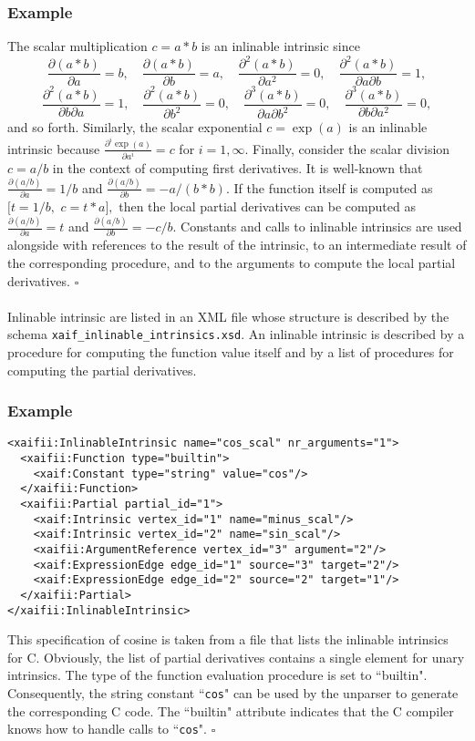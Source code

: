 \documentclass{book}
\begin{document}
\subsubsection{Example}
The scalar multiplication $c=a*b$ 
is an inlinable 
intrinsic since
$$
\frac{\partial (a*b)}{\partial a} = b, \quad
\frac{\partial (a*b)}{\partial b} = a, \quad
\frac{\partial^2 (a*b)}{\partial a^2} = 0, \quad
\frac{\partial^2 (a*b)}{\partial a \partial b} = 1, 
$$
$$
\frac{\partial^2 (a*b)}{\partial b \partial a} = 1, \quad
\frac{\partial^2 (a*b)}{\partial b^2} = 0, \quad
\frac{\partial^3 (a*b)}{\partial a \partial b^2} = 0, \quad
\frac{\partial^3 (a*b)}{\partial b \partial a^2} = 0, 
$$
and so forth.
Similarly, 
the scalar exponential $c=\exp(a)$ 
is an inlinable intrinsic because 
$ \frac{\partial^i \exp(a)}{\partial a^i} = c $
for $i=1,\infty.$ 
Finally, consider the scalar division
$c=a/b$ in the context of
computing first derivatives. It is well-known that
$ \frac{\partial (a/b)}{\partial a} = 1/b$ and
$\frac{\partial (a/b)}{\partial b} = -a/(b*b).$ If the function
itself is computed as 
$[t=1/b,$ $c=t*a],$
then the local partial derivatives can be computed as
$ \frac{\partial (a/b)}{\partial a} = t$ and
$\frac{\partial (a/b)}{\partial b} = -c/b.$ Constants and 
calls to inlinable intrinsics are used alongside with references to
the result of the intrinsic, to an intermediate result of
the corresponding procedure, and to the arguments to compute
the local partial derivatives. $\square$ \\
\\
Inlinable intrinsic are listed in an XML file whose structure
is described by the schema {\tt xaif\_inlinable\_intrinsics.xsd}.
An inlinable intrinsic is described by a procedure for computing
the function value itself and by a list of procedures for computing
the partial derivatives.
\subsubsection{Example}
\begin{verbatim}
<xaifii:InlinableIntrinsic name="cos_scal" nr_arguments="1">
  <xaifii:Function type="builtin">
    <xaif:Constant type="string" value="cos"/>
  </xaifii:Function>
  <xaifii:Partial partial_id="1">
    <xaif:Intrinsic vertex_id="1" name="minus_scal"/>
    <xaif:Intrinsic vertex_id="2" name="sin_scal"/>
    <xaifii:ArgumentReference vertex_id="3" argument="2"/>
    <xaif:ExpressionEdge edge_id="1" source="3" target="2"/>
    <xaif:ExpressionEdge edge_id="2" source="2" target="1"/>
  </xaifii:Partial>
</xaifii:InlinableIntrinsic>
\end{verbatim}
This specification of cosine is taken from a file that lists
the inlinable intrinsics for C.
Obviously, the list of partial derivatives contains a single element for
unary intrinsics. 
The type of the function evaluation procedure is set to ``builtin".
Consequently, the string constant ``{\tt cos}" can be used by the unparser
to generate the corresponding C code. The ``builtin" attribute indicates
that the C compiler knows how to handle calls to ``{\tt cos}". $\square$ \\ 
\\
\end{document}
